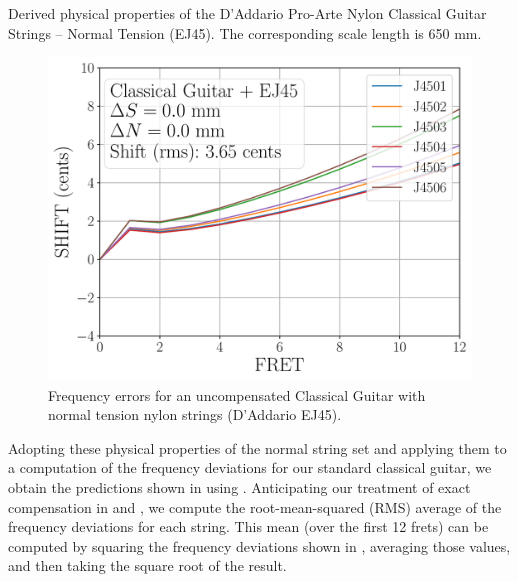 \begin{table}%
  \centering
  \caption{\label{tbl:ej45_props} Derived physical properties of the D'Addario Pro-Arte Nylon Classical Guitar Strings -- Normal Tension (EJ45). The corresponding scale length is 650 mm.}
  
\end{table}%

\begin{figure}
  \centering
  \includegraphics[width=5.0in]{../figures/shift_classicalguitar_ej45_null}
  \caption{\label{fig:shift_classicalguitar_ej45_null} Frequency errors for an uncompensated Classical Guitar with normal tension nylon strings (D'Addario EJ45).}
\end{figure}

Adopting these physical properties of the normal string set and applying them to a computation of the frequency deviations for our standard classical guitar, we obtain the predictions shown in  using . Anticipating our treatment of exact compensation in  and , we compute the root-mean-squared (RMS) average of the frequency deviations for each string. This mean (over the first 12 frets) can be computed by squaring the frequency deviations shown in , averaging those values, and then taking the square root of the result.

